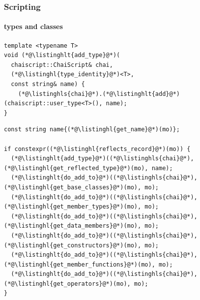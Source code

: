 \documentclass[compress,table,xcolor=table]{beamer}
\begin{document}
\begin{frame}[fragile]
  \frametitle{Scripting}
  \framesubtitle{types and classes}
  \begin{lstlisting}[language=c++2x,basicstyle=\footnotesize\ttfamily]
template <typename T>
void (*@\listinghlt{add_type}@*)(
  chaiscript::ChaiScript& chai,
  (*@\listinghl{type_identity}@*)<T>,
  const string& name) {
    (*@\listinghls{chai}@*).(*@\listinghlt{add}@*)(chaiscript::user_type<T>(), name);
}
  \end{lstlisting}
  \begin{lstlisting}[language=c++2x,basicstyle=\footnotesize\ttfamily]
const string name{(*@\listinghl{get_name}@*)(mo)};

if constexpr((*@\listinghl{reflects_record}@*)(mo)) {
  (*@\listinghlt{add_type}@*)((*@\listinghls{chai}@*),  (*@\listinghl{get_reflected_type}@*)(mo), name);
  (*@\listinghlt{do_add_to}@*)((*@\listinghls{chai}@*), (*@\listinghl{get_base_classes}@*)(mo), mo);
  (*@\listinghlt{do_add_to}@*)((*@\listinghls{chai}@*), (*@\listinghl{get_member_types}@*)(mo), mo);
  (*@\listinghlt{do_add_to}@*)((*@\listinghls{chai}@*), (*@\listinghl{get_data_members}@*)(mo), mo);
  (*@\listinghlt{do_add_to}@*)((*@\listinghls{chai}@*), (*@\listinghl{get_constructors}@*)(mo), mo);
  (*@\listinghlt{do_add_to}@*)((*@\listinghls{chai}@*), (*@\listinghl{get_member_functions}@*)(mo), mo);
  (*@\listinghlt{do_add_to}@*)((*@\listinghls{chai}@*), (*@\listinghl{get_operators}@*)(mo), mo);
}
  \end{lstlisting}
\end{frame}
\end{document}
